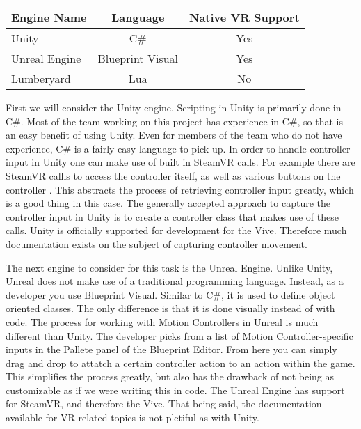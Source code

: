 \documentclass[10pt,journal,compsoc,onecolumn, draftclsnofoot]{IEEEtran}
\begin{document}
\vspace{2mm}
\begin{table}[h!]
\centering
  \begin{tabular}{ | l || c | c |  }
  \hline
  Engine Name & Language & Native VR Support\\
  \hline
  Unity  & C\# & Yes\\ \hline
  Unreal Engine & Blueprint Visual & Yes\\ \hline
  Lumberyard & Lua & No\\ \hline
  \hline
  \end{tabular}
\end{table}
\vspace{2mm}

First we will consider the Unity engine. Scripting in Unity is primarily done in C\#.
Most of the team working on this project has experience in C\#, so that is an easy benefit of using Unity.
Even for members of the team who do not have experience, C\# is a fairly easy language to pick up.
In order to handle controller input in Unity one can make use of built in SteamVR calls.
For example there are SteamVR callls to access the controller itself, as well as various buttons on the controller \cite{steamvr_controllers}.
This abstracts the process of retrieving controller input greatly, which is a good thing in this case.
The generally accepted approach to capture the controller input in Unity is to create a controller class that makes use of these calls.
Unity is officially supported for development for the Vive.
Therefore much documentation exists on the subject of capturing controller movement.

The next engine to consider for this task is the Unreal Engine.
Unlike Unity, Unreal does not make use of a traditional programming language.
Instead, as a developer you use Blueprint Visual.
Similar to C\#, it is used to define object oriented classes.
The only difference is that it is done visually instead of with code.
The process for working with Motion Controllers in Unreal is much different than Unity.
The developer picks from a list of Motion Controller-specific inputs in the Pallete panel of the Blueprint Editor\cite{unreal_controller}.
From here you can simply drag and drop to attatch a certain controller action to an action within the game.
This simplifies the process greatly, but also has the drawback of not being as customizable as if we were writing this in code.
The Unreal Engine has support for SteamVR, and therefore the Vive.
That being said, the documentation available for VR related topics is not pletiful as with Unity.
\end{document}
